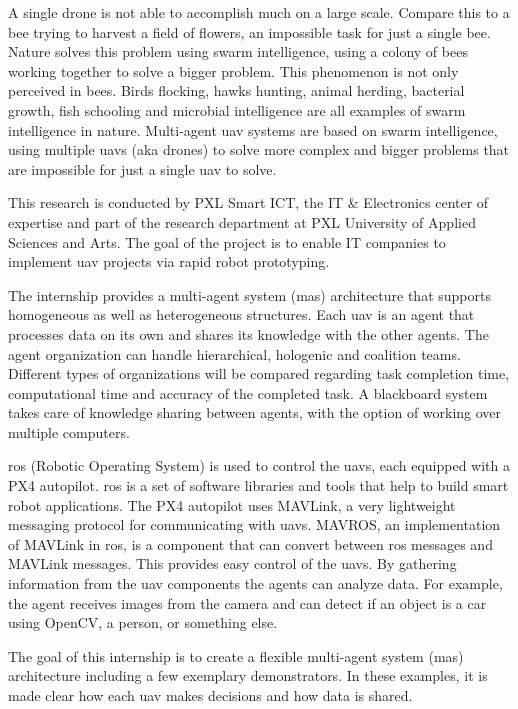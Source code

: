 A single drone is not able to accomplish much on a large scale. Compare this to a bee trying to harvest a 
field of flowers, an impossible task for just a single bee. Nature solves this problem using swarm intelligence, 
using a colony of bees working together to solve a bigger problem. This phenomenon is not only perceived in bees. Birds flocking, 
hawks hunting, animal herding, bacterial growth, fish schooling and microbial intelligence are all examples 
of swarm intelligence in nature. Multi-agent \acs{uav} systems are based on swarm intelligence, using multiple 
\acsp{uav} (aka drones) to solve more complex and bigger problems that are impossible for just a single \acs{uav} to solve.

This research is conducted by PXL Smart ICT, the IT \& Electronics center of expertise and part of the research 
department at PXL University of Applied Sciences and Arts. The goal of the project is to enable IT companies to 
implement \acs{uav} projects via rapid robot prototyping.

The internship provides a multi-agent system (\acs{mas}) architecture that supports homogeneous as well as heterogeneous 
structures. Each \acs{uav} is an agent that processes data on its own and shares its knowledge with the other agents. 
The agent organization can handle hierarchical, hologenic and coalition teams. Different types of organizations will 
be compared regarding task completion time, computational time and accuracy of the completed task. A blackboard system 
takes care of knowledge sharing between agents, with the option of working over multiple computers. 

\acs{ros} (Robotic Operating System) is used to control the \acsp{uav}, each equipped with a PX4 autopilot. \acs{ros} is a set of 
software libraries and tools that help to build smart robot applications. The PX4 autopilot uses MAVLink, a very 
lightweight messaging protocol for communicating with \acsp{uav}. MAVROS, an implementation of MAVLink in \acs{ros}, is a 
component that can convert between \acs{ros} messages and MAVLink messages. This provides easy control of the \acsp{uav}. By 
gathering information from the \acs{uav} components the agents can analyze data. For example, the agent receives images 
from the camera and can detect if an object is a car using OpenCV, a person, or something else.

The goal of this internship is to create a flexible multi-agent system (\acs{mas}) architecture including a few exemplary 
demonstrators. In these examples, it is made clear how each \acs{uav} makes decisions and how data is shared.

